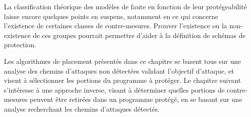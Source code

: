             La classification théorique des modèles de faute en fonction de leur protégeabilité laisse encore quelques points en suspens, notamment en ce qui concerne l'existence de certaines classes de contre-mesures. Prouver l'existence ou la non-existence de ces groupes pourrait permettre d'aider à la définition de schémas de protection.
            
            Les algorithmes de placement présentés dans ce chapitre se basent tous sur une analyse des chemins d'attaques non détectées validant l'objectif d'attaque, et visent à sélectionner les portions du programme à protéger.
            Le chapitre suivant s'intéresse à une approche inverse, visant à déterminer quelles portions de contre-mesures peuvent être retirées dans un programme protégé, en se basant sur une analyse recherchant les chemins d'attaques détectés.